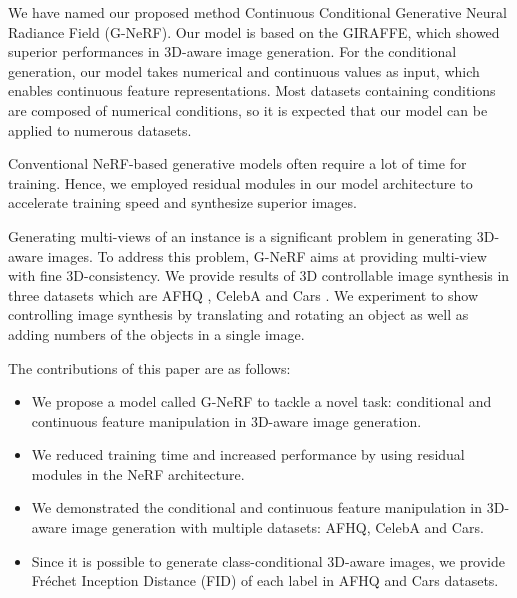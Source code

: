 \documentclass[nohyperref]{article}
\theoremstyle{plain}
\theoremstyle{definition}
\theoremstyle{remark}
\begin{document}
We have named our proposed method Continuous Conditional Generative Neural Radiance Field (G-NeRF). Our model is based on the GIRAFFE, which showed superior performances in 3D-aware image generation. For the conditional generation, our model takes numerical and continuous values as input, which enables continuous feature representations. Most datasets containing conditions are composed of numerical conditions, so it is expected that our model can be applied to numerous datasets. 

Conventional NeRF-based generative models often require a lot of time for training. Hence, we employed residual modules \cite{he2016deep, he2016identity} in our model architecture to accelerate training speed and synthesize superior images.

Generating multi-views of an instance is a significant problem in generating 3D-aware images. To address this problem, G-NeRF aims at providing multi-view with fine 3D-consistency. We provide results of 3D controllable image synthesis in three datasets which are AFHQ \cite{choi2020stargan}, CelebA \cite{liu2015deep} and Cars \cite{ashrafi_2022}. We experiment to show controlling image synthesis by translating and rotating an object as well as adding numbers of the objects in a single image. 

The contributions of this paper are as follows: 


\begin{itemize}
\item We propose a model called G-NeRF to tackle a novel task: conditional and continuous feature manipulation in 3D-aware image generation. 
\item We reduced training time and increased performance by using residual modules in the NeRF architecture. 
\item We demonstrated the conditional and continuous feature manipulation in 3D-aware image generation with multiple datasets: AFHQ, CelebA and Cars. 
\item Since it is possible to generate class-conditional 3D-aware images, we provide Fréchet Inception Distance (FID) of each label in AFHQ and Cars datasets. 
\end{itemize}
\end{document}
